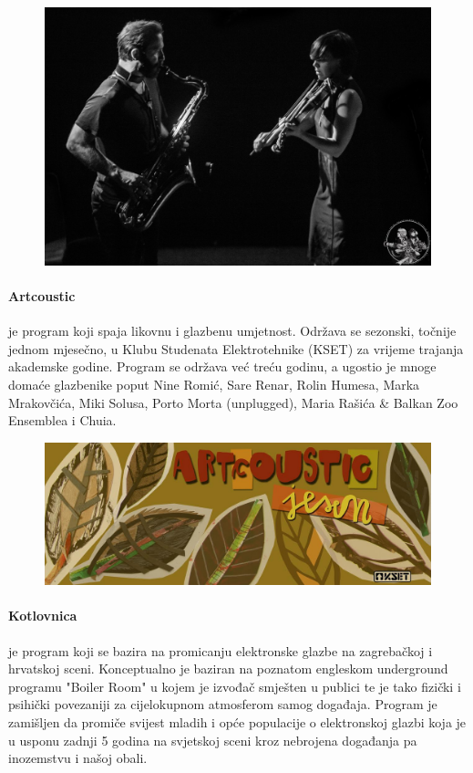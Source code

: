 \documentclass[12pt,a4paper,oneside]{article}
\begin{document}
	\begin{figure}[h!]
		\centering
		\vspace{5mm}
		\includegraphics[scale=0.25]{zez.jpg}	
	\end{figure}
	
	\paragraph{Artcoustic} je program koji spaja likovnu i glazbenu umjetnost. Održava se sezonski, točnije jednom mjesečno, u Klubu Studenata Elektrotehnike (KSET) za vrijeme trajanja akademske godine.  Program se održava već treću godinu, a ugostio je mnoge domaće glazbenike poput Nine Romić, Sare Renar, Rolin Humesa, Marka Mrakovčića, Miki Solusa, Porto Morta (unplugged), Maria Rašića \& Balkan Zoo Ensemblea i Chuia.
	
	\begin{figure}[h!]
		\centering
		\vspace{5mm}
		\includegraphics[scale=0.25]{artcoustic.jpg}	
	\end{figure}
	
	\paragraph{Kotlovnica} je program koji se bazira na promicanju elektronske glazbe na zagrebačkoj i hrvatskoj sceni. Konceptualno je baziran na poznatom engleskom underground programu "Boiler Room" u kojem je izvođač smješten u publici te je tako fizički i psihički povezaniji za cijelokupnom atmosferom samog događaja. Program je zamišljen da promiče svijest mladih i opće populacije o elektronskoj glazbi koja je u usponu zadnji 5 godina na svjetskoj sceni kroz nebrojena događanja pa inozemstvu i našoj obali.
	
\end{document}
